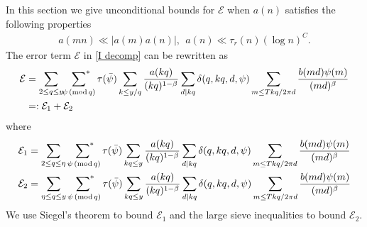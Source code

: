 \documentclass[oneside, 12pt]{amsart}
\theoremstyle{definition}
\renewcommand{\pmod}[1]{\,(\textup{mod}\,#1)}
\newcommand{\mc}{\mathcal}
\newcommand{\geqs}{\geqslant }
\begin{document}

In this section we give unconditional bounds for $\mathcal{E}$ when $a(n)$ satisfies the following properties 
\begin{align}
a(mn)\ll |a(m)a(n)|, \ \ a(n)\ll \tau_r(n)(\log n)^C.
\end{align}
The error term $\mc{E}$ in \eqref{I decomp} can be rewritten as 
\begin{align*}
\mathcal{E}
&=\sum_{2\leq q\leq y} \sideset{}{^*}\sum_{\psi\pmod q}\tau(\bar{\psi}) \sum_{k\leq y/q}\frac{a(kq)}{(kq)^{1-\beta}}\sum_{d\mid kq}\delta(q,kq,d,\psi)\sum_{m\leq Tkq/2\pi d}\frac{b(md)\psi(m)}{(md)^\beta}\\
&=:\mathcal{E}_1+\mathcal{E}_2
\end{align*}
where 
\begin{align}
&\mathcal{E}_1= \sum_{2\leq q\leq \eta} \sideset{}{^*}\sum_{\,\,\psi \pmod q} \tau(\bar{\psi}) \sum_{kq\leq y} \frac{a(kq)}{(kq)^{1-\beta}}\sum_{d\mid kq} \delta(q, kq, d, \psi)\sum_{m\leq Tkq/2\pi d}\frac{b(md)\psi(m)}{(md)^\beta}\\
&\mathcal{E}_2=\sum_{\eta \leq q\leq y} \sideset{}{^*}\sum_{\,\,\psi \pmod q} \tau(\bar{\psi}) \sum_{kq\leq y} \frac{a(kq)}{(kq)^{1-\beta}}\sum_{d\mid kq} \delta(q, kq, d, \psi)\sum_{m\leq Tkq/2\pi d}\frac{b(md)\psi(m)}{(md)^\beta}
\end{align}
We use Siegel's theorem to bound $\mathcal{E}_1$ and the large sieve inequalities to bound $\mathcal{E}_2$.
\end{document}
